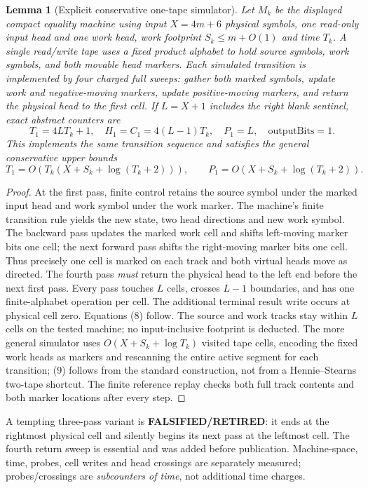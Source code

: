 \documentclass[11pt]{article}
\newtheorem{lemma}[theorem]{Lemma}
\begin{document}
\begin{lemma}[Explicit conservative one-tape simulator]
Let $M_k$ be the displayed compact equality machine using input
$X=4m+6$ physical symbols, one read-only input head and one work head,
work footprint $S_k\le m+O(1)$ and time $T_k$. A single read/write
tape uses a fixed product alphabet to hold source symbols, work symbols,
and both movable head markers. Each simulated transition is implemented
by \emph{four charged full sweeps}: gather both marked symbols,
update work and negative-moving markers, update positive-moving
markers, and return the physical head to the first cell. If
$L=X+1$ includes the right blank sentinel, exact abstract counters are
\[
 T_1=4LT_k+1,\quad H_1=C_1=4(L-1)T_k,\quad P_1=L,\quad
 \mathrm{outputBits}=1.                                          \tag{8}
\]
This implements the same transition sequence and satisfies the general
conservative upper bounds
\[
 T_1=O(T_k(X+S_k+\log(T_k+2))),\qquad
 P_1=O(X+S_k+\log(T_k+2)).                                    \tag{9}
\]
\end{lemma}
\begin{proof}
At the first pass, finite control retains the source symbol under the
marked input head and work symbol under the work marker. The machine's
finite transition rule yields the new state, two head directions and new
work symbol. The backward pass updates the marked work cell and shifts
left-moving marker bits one cell; the next forward pass shifts the
right-moving marker bits one cell. Thus precisely one cell is marked on
each track and both virtual heads move as directed. The fourth pass
\emph{must} return the physical head to the left end before the next
first pass. Every pass touches $L$ cells, crosses $L-1$ boundaries,
and has one finite-alphabet operation per cell. The additional terminal
result write occurs at physical cell zero. Equations (8) follow.
The source and work tracks stay within $L$ cells on the tested machine;
no input-inclusive footprint is deducted. The more general simulator
uses $O(X+S_k+\log T_k)$ visited tape cells, encoding the fixed work
heads as markers and rescanning the entire active segment for each
transition; (9) follows from the standard construction, not from a
Hennie--Stearns two-tape shortcut. The finite reference replay checks
both full track contents and both marker locations after every step.
\end{proof}

A tempting three-pass variant is \textbf{FALSIFIED/RETIRED}: it ends at
the rightmost physical cell and silently begins its next pass at the
leftmost cell. The fourth return sweep is essential and was added
before publication. Machine-space, time, probes, cell writes and head
crossings are separately measured; probes/crossings are
\emph{subcounters of time}, not additional time charges.
\end{document}
